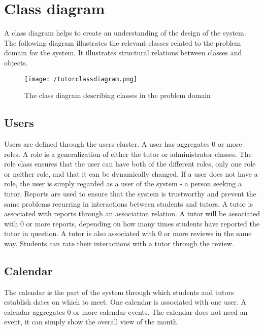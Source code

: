 \section{Class diagram}
A class diagram helps to create an understanding of the design of the system.
The following diagram illustrates the relevant classes related to the problem domain for the system.
It illustrates structural relations between classes and objects.

\begin{figure}[H]
    \texttt{[image: /tutorclassdiagram.png]}
     \caption{The class diagram describing classes in the problem domain}
     \label{fig:class-diagram}
 \end{figure}

\subsection{Users}
Users are defined through the users cluster.
A user has aggregates 0 or more roles. 
A role is a generalization of either the tutor or administrator classes. 
The role class ensures that the user can have both of the different roles, only one role or neither role, and that it can be dynamically changed.
If a user does not have a role, the user is simply regarded as a user of the system - a person seeking a tutor. 
Reports are used to ensure that the system is trustworthy and prevent the same problems recurring in interactions between students and tutors.
A tutor is associated with reports through an association relation.
A tutor will be associated with 0 or more reports, depending on how many times students have reported the tutor in question.
A tutor is also associated with 0 or more reviews in the same way. 
Students can rate their interactions with a tutor through the review.

\subsection{Calendar}
The calendar is the part of the system through which students and tutors establish dates on which to meet. 
One calendar is associated with one user.
A calendar aggregates 0 or more calendar events. 
The calendar does not need an event, it can simply show the overall view of the month.

